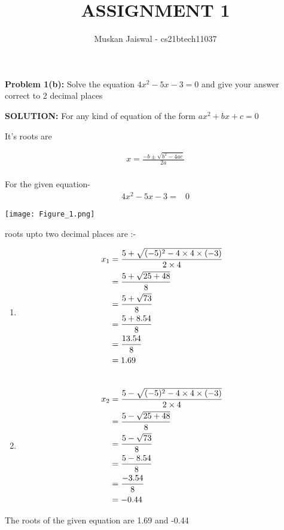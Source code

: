 \documentclass[journal,12pt,two column]{IEEEtran}
\title{ASSIGNMENT 1 }
\author{Muskan Jaiswal - cs21btech11037}
\begin{document}
\maketitle
\textbf{Problem 1(b):} Solve the equation $4x^2-5x-3=0$ and give your answer correct to 2 decimal places
\bigskip

\textbf{SOLUTION:}     For any kind of equation of the form  $ax^2+bx+c=0$

It's roots are
\\ \bigskip

\begin{align*}
x={\frac{-b\pm\sqrt{b^2-4ac}}{2a}}\\
\end{align*}

For the given equation-
\begin{align}
    4x^2-5x-3=&0
\end{align}

\texttt{[image: Figure\_1.png]}

roots upto two decimal places are :-
    
 \begin{enumerate}
     \item 
 \begin{align*} 
x_1 &= \frac{5+\sqrt{(-5)^2-4\times4\times(-3)}}{2\times4}\\ 
&=\frac{5+\sqrt{25+48}}{8}\\ 
&=\frac{5+\sqrt{73}}{8}\\
 &=\frac{5+8.54}{8} \\ 
 &=\frac{13.54}{8}\\ 
 &=1.69 \\ \bigskip
\end{align*}
\item
\begin{align*}
x_2 &=\frac{5-\sqrt{(-5)^2-4\times4\times(-3)}}{2\times4}\\ \bigskip
&=\frac{5-\sqrt{25+48}}{8}\\ \bigskip
&=\frac{5-\sqrt{73}}{8}\\ \bigskip
&=\frac{5-8.54}{8} \\ \bigskip
&=\frac{-3.54}{8} \\ \bigskip
&=-0.44\\
\end{align*}
\end{enumerate}


\bigskip
The roots of the given equation are 1.69 and -0.44
\end{document}

